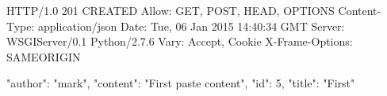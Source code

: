 \documentclass[a4paper, 12pt, twoside]{book}
\begin{document}
	\begin{bash}[caption={[nowe schowki]WebAPI - wynik tworzenia nowego schowka - Mark}]
HTTP/1.0 201 CREATED
Allow: GET, POST, HEAD, OPTIONS
Content-Type: application/json
Date: Tue, 06 Jan 2015 14:40:34 GMT
Server: WSGIServer/0.1 Python/2.7.6
Vary: Accept, Cookie
X-Frame-Options: SAMEORIGIN

{
    "author": "mark", 
    "content": "First paste content", 
    "id": 5, 
    "title": "First"
}
\end{bash}
\end{document}
